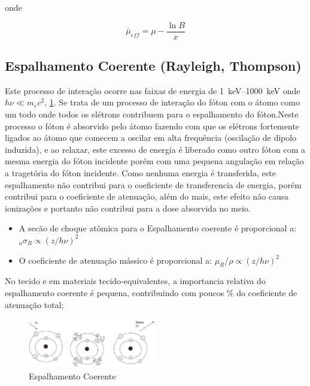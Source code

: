 \documentclass[11pt,a4paper]{article}
\begin{document}
            \noindent onde

                \begin{equation}
                    \bar{\mu}_{eff} = \mu - \frac{\ln B}{x}
                \end{equation}




        \subsection{Espalhamento Coerente (Rayleigh, Thompson)}

            Este processo de interação ocorre nas faixas de energia de \qtyrange{1}{1000}{keV} onde $h\nu \ll m_ec^2$, \ref{fig:espalhamentoCoerente}. Se trata de um processo de interação do fóton com o átomo como um todo onde todos os elétrons contribuem para o espalhamento do fóton.Neste processo o fóton é absorvido pelo átomo fazendo com que os elétrons fortemente ligados ao átomo que comecem a oscilar em alta frequência (oscilação de dipolo induzida), e ao relaxar, este excesso de energia é liberado como outro fóton com a mesma energia do fóton incidente porém com uma pequena angulação em relação a tragetória do fóton incidente. Como nenhuma energia é transferida, este espalhamento não contribui para o coeficiente de transferencia de energia, porém contribui para o coeficiente de atenuação, além do mais, este efeito não causa ionizações e portanto não contribui para a dose absorvida no meio.

            \begin{itemize}
                \item A secão de choque atômica para o Espalhamento coerente é proporcional a:  ${}_a\sigma_R \propto (z / h\nu)^2$
                \item O coeficiente de atenuação mássico é proporcional a: $\mu_R / \rho \propto (z / h\nu)^2$
            \end{itemize}

            No tecido e em materiais tecido-equivalentes, a importancia relativa do espalhamento coerente é pequena, contribuindo com poucos \% do coeficiente de atenuação total;

            \begin{figure}[h]
                \centering
                \includegraphics[width=0.5\textwidth]{Imagens/espalhamentoCoerente.JPG}
                \caption{Espalhamento Coerente}
                \label{fig:espalhamentoCoerente}
            \end{figure}
\end{document}
